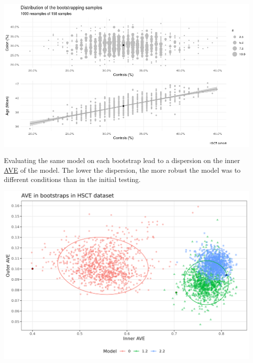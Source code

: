 \documentclass[
  12pt,
  a4paper,
  twoside,
  openright]{book}
\let\origfigure\figure
\let\endorigfigure\endfigure
\renewenvironment{figure}[1][2] {
    \expandafter\origfigure\expandafter[!htbp]
} {
    \endorigfigure
}
\begin{document}
\begin{figure}
\includegraphics[width=1\linewidth]{images/hsct-bootstrap-characteristics} \caption[Characteristics of the samples of the HSCT bootstraped samples.]{Dispersion of the bootstraped samples on age and percentage of colon and controls samples. The bootstraps represent a wide range of different composition.}\label{fig:hsct-bootstrap-quality}
\end{figure}

Evaluating the same model on each bootstrap lead to a dispersion on the inner \protect\hyperlink{acronyms_AVE}{AVE} of the model.
The lower the dispersion, the more robust the model was to different conditions than in the initial testing.

\begin{figure}
\includegraphics[width=1\linewidth]{images/hsct_bootstrap_models} \caption[Bootstrap results in HSCT dataset.]{Bootstrap of the models 0, 1.2 and 2.2 in the HSCT dataset. Model 0 and 1.2 have lower inner and outer AVE score, model 2.2 has lower outer score but higher inner value than the bootstrapped. Each point represents a bootstrapped sample (colored by model used).
The dispersion is shown by the ellipses. The point with the black circle is the AVE of the original data.}\label{fig:hsct-bootstrap}
\end{figure}
\end{document}

